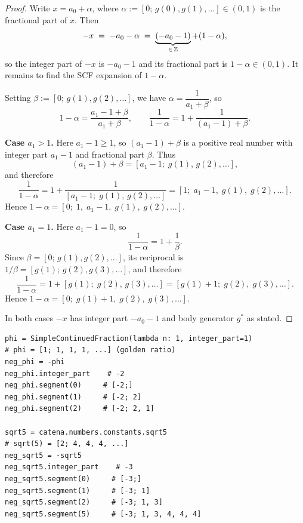 \begin{proof}
  Write $x = a_0 + \alpha$, where $\alpha := [0;\, g(0), g(1), \ldots] \in (0, 1)$ is
  the fractional part of $x$.  Then
  \[
    -x \;=\; -a_0 - \alpha \;=\; \underbrace{(-a_0 - 1)}_{\in\,\mathbb{Z}} + (1 - \alpha),
  \]
  so the integer part of $-x$ is $-a_0 - 1$ and its fractional part is $1 - \alpha \in (0,1)$.
  It remains to find the SCF expansion of $1 - \alpha$.

  Setting $\beta := [0;\, g(1), g(2), \ldots]$, we have $\alpha = \dfrac{1}{a_1 + \beta}$, so
  \[
    1 - \alpha = \frac{a_1 - 1 + \beta}{a_1 + \beta},
    \qquad
    \frac{1}{1 - \alpha} = 1 + \frac{1}{(a_1 - 1) + \beta}.
  \]

  \textbf{Case $a_1 > 1$.}\;
  Here $a_1 - 1 \geq 1$, so $(a_1 - 1) + \beta$ is a positive real number with integer part
  $a_1 - 1$ and fractional part $\beta$.  Thus
  \[
    (a_1 - 1) + \beta = [a_1 - 1;\; g(1),\, g(2),\ldots],
  \]
  and therefore
  \[
    \frac{1}{1 - \alpha}
      = 1 + \frac{1}{[a_1 - 1;\; g(1),\, g(2), \ldots]}
      = [1;\; a_1 - 1,\; g(1),\; g(2), \ldots].
  \]
  Hence $1 - \alpha = [0;\; 1,\; a_1 - 1,\; g(1),\; g(2), \ldots]$.

  \textbf{Case $a_1 = 1$.}\;
  Here $a_1 - 1 = 0$, so
  \[
    \frac{1}{1 - \alpha} = 1 + \frac{1}{\beta}.
  \]
  Since $\beta = [0;\, g(1), g(2), \ldots]$, its reciprocal is
  $1/\beta = [g(1);\, g(2), g(3), \ldots]$, and therefore
  \[
    \frac{1}{1 - \alpha}
      = 1 + [g(1);\; g(2),\, g(3), \ldots]
      = [g(1) + 1;\; g(2),\; g(3), \ldots].
  \]
  Hence $1 - \alpha = [0;\; g(1) + 1,\; g(2),\; g(3), \ldots]$.

  In both cases $-x$ has integer part $-a_0 - 1$ and body generator $g^*$ as stated.
\end{proof}

\begin{catenadef}
\begin{lstlisting}[style=python]
phi = SimpleContinuedFraction(lambda n: 1, integer_part=1)
# phi = [1; 1, 1, 1, ...] (golden ratio)
neg_phi = -phi
neg_phi.integer_part    # -2
neg_phi.segment(0)     # [-2;]
neg_phi.segment(1)     # [-2; 2]
neg_phi.segment(2)     # [-2; 2, 1]

sqrt5 = catena.numbers.constants.sqrt5
# sqrt(5) = [2; 4, 4, 4, ...]
neg_sqrt5 = -sqrt5
neg_sqrt5.integer_part    # -3
neg_sqrt5.segment(0)     # [-3;]
neg_sqrt5.segment(1)     # [-3; 1]
neg_sqrt5.segment(2)     # [-3; 1, 3]
neg_sqrt5.segment(5)     # [-3; 1, 3, 4, 4, 4]
\end{lstlisting}
\end{catenadef}

